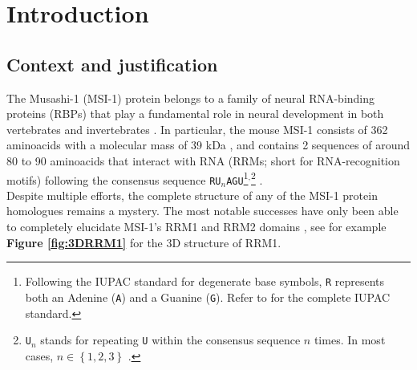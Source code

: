 \section{Introduction}

\subsection{Context and justification}

The Musashi-1 (MSI-1) protein belongs to a family of neural RNA-binding proteins (RBPs) that play a fundamental role in neural development in both vertebrates and invertebrates \cite{nakamura_1994,sakakibara_1996, good_1998, imai_2001}. In particular, the mouse MSI-1 consists of 362 aminoacids with a molecular mass of 39 kDa \cite{sakakibara_1996}, and contains 2 sequences of around 80 to 90 aminoacids that interact with RNA (RRMs; short for RNA-recognition motifs) following the consensus sequence \texttt{RU}$_n$\texttt{AGU}\footnote{Following the IUPAC standard for degenerate base symbols, \texttt{R} represents both an Adenine (\texttt{A}) and a Guanine (\texttt{G}). Refer to \cite{cornish_1985} for the complete IUPAC standard.}$^,$\footnote{\texttt{U}$_n$ stands for repeating \texttt{U} within the consensus sequence $n$ times. In most cases, $n\in\left\{1,2,3\right\}$ \cite{imai_2001}.} \cite{imai_2001,zearfoss_2014}.\\

Despite multiple efforts, the complete structure of any of the MSI-1 protein homologues remains a mystery. The most notable successes have only been able to completely elucidate MSI-1's RRM1 and RRM2 domains \cite{nagata_1999,miyanoiri_2003,ohyama_2011,lan_2019}, see for example \textbf{Figure \ref{fig:3DRRM1}} for the 3D structure of RRM1. 

